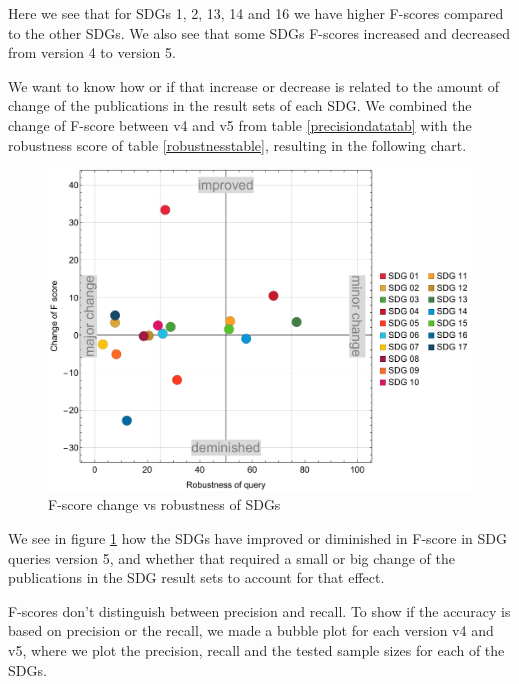 \documentclass{article}
\begin{document}
Here we see that for SDGs 1, 2, 13, 14 and 16 we have higher F-scores compared to the other SDGs. We also see that some SDGs F-scores increased and decreased from version 4 to version 5.

We want to know how or if that increase or decrease is related to the amount of change of the publications in the result sets of each SDG. We combined the change of F-score between v4 and v5 from table \ref{precisiondatatab} with the robustness score of table \ref{robustnesstable}, resulting in the following chart. 

\begin{figure}[H]
	\centering
  \includegraphics[width=\textwidth]{figures/scatterplot1-fscore-robustness.pdf}
	\caption{F-score change vs robustness of SDGs}
	\label{fscore-vs-robustnes}
\end{figure}

We see in figure \ref{fscore-vs-robustnes} how the SDGs have improved or diminished in F-score in SDG queries version 5, and whether that required a small or big change of the publications in the SDG result sets to account for that effect.

F-scores don't distinguish between precision and recall. To show if the accuracy is based on precision or the recall, we made a bubble plot for each version v4 and v5, where we plot the precision, recall and the tested sample sizes for each of the SDGs. 
\end{document}
